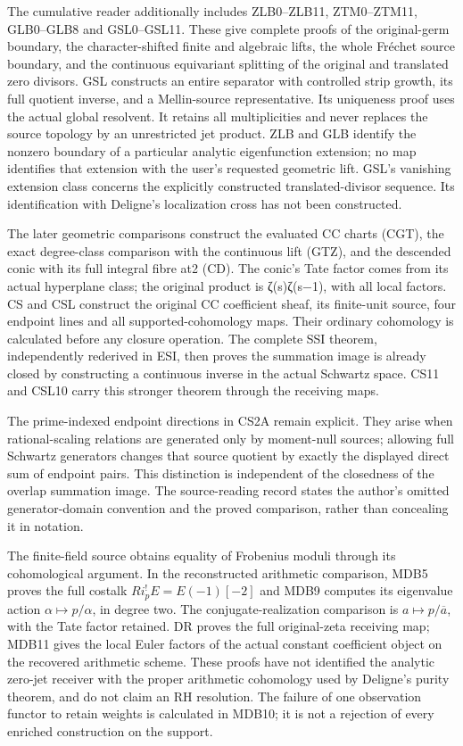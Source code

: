 \documentclass[
]{report}
\begin{document}
The cumulative reader additionally includes ZLB0--ZLB11, ZTM0--ZTM11,
GLB0--GLB8 and GSL0--GSL11. These give complete proofs of the
original-germ boundary, the character-shifted finite and algebraic
lifts, the whole Fréchet source boundary, and the continuous equivariant
splitting of the original and translated zero divisors. GSL constructs
an entire separator with controlled strip growth, its full quotient
inverse, and a Mellin-source representative. Its uniqueness proof uses
the actual global resolvent. It retains all multiplicities and never
replaces the source topology by an unrestricted jet product. ZLB and GLB
identify the nonzero boundary of a particular analytic eigenfunction
extension; no map identifies that extension with the user's requested
geometric lift. GSL's vanishing extension class concerns the explicitly
constructed translated-divisor sequence. Its identification with
Deligne's localization cross has not been constructed.

The later geometric comparisons construct the evaluated CC charts (CGT),
the exact degree-class comparison with the continuous lift (GTZ), and
the descended conic with its full integral fibre at2 (CD). The conic's
Tate factor comes from its actual hyperplane class; the original product
is ζ(s)ζ(s−1), with all local factors. CS and CSL construct the original
CC coefficient sheaf, its finite-unit source, four endpoint lines and
all supported-cohomology maps. Their ordinary cohomology is calculated
before any closure operation. The complete SSI theorem, independently
rederived in ESI, then proves the summation image is already closed by
constructing a continuous inverse in the actual Schwartz space. CS11 and
CSL10 carry this stronger theorem through the receiving maps.

The prime-indexed endpoint directions in CS2A remain explicit. They
arise when rational-scaling relations are generated only by moment-null
sources; allowing full Schwartz generators changes that source quotient
by exactly the displayed direct sum of endpoint pairs. This distinction
is independent of the closedness of the overlap summation image. The
source-reading record states the author's omitted generator-domain
convention and the proved comparison, rather than concealing it in
notation.

The finite-field source obtains equality of Frobenius moduli through its
cohomological argument. In the reconstructed arithmetic comparison, MDB5
proves the full costalk \(Ri_p^!E=E(-1)[-2]\) and MDB9 computes its
eigenvalue action \(\alpha\mapsto p/\alpha\), in degree two. The
conjugate-realization comparison is \(a\mapsto p/\overline a\), with the
Tate factor retained. DR proves the full original-zeta receiving map;
MDB11 gives the local Euler factors of the actual constant coefficient
object on the recovered arithmetic scheme. These proofs have not
identified the analytic zero-jet receiver with the proper arithmetic
cohomology used by Deligne's purity theorem, and do not claim an RH
resolution. The failure of one observation functor to retain weights is
calculated in MDB10; it is not a rejection of every enriched
construction on the support.
\end{document}
